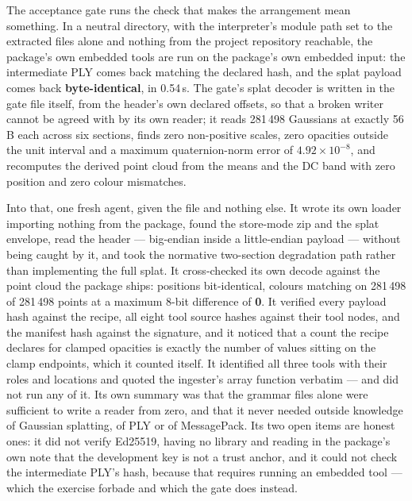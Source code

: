 \documentclass[10pt,twocolumn,letterpaper]{article}
\begin{document}
The acceptance gate runs the check that makes the arrangement mean something. In a neutral directory, with the interpreter's module path set to the extracted files alone and nothing from the project repository reachable, the package's own embedded tools are run on the package's own embedded input: the intermediate PLY comes back matching the declared hash, and the splat payload comes back \textbf{byte-identical}, in 0.54\,s. The gate's splat decoder is written in the gate file itself, from the header's own declared offsets, so that a broken writer cannot be agreed with by its own reader; it reads 281\,498 Gaussians at exactly 56\,B each across six sections, finds zero non-positive scales, zero opacities outside the unit interval and a maximum quaternion-norm error of $4.92\times10^{-8}$, and recomputes the derived point cloud from the means and the DC band with zero position and zero colour mismatches.

Into that, one fresh agent, given the file and nothing else. It wrote its own loader importing nothing from the package, found the store-mode zip and the splat envelope, read the header --- big-endian inside a little-endian payload --- without being caught by it, and took the normative two-section degradation path rather than implementing the full splat. It cross-checked its own decode against the point cloud the package ships: positions bit-identical, colours matching on 281\,498 of 281\,498 points at a maximum 8-bit difference of \textbf{0}. It verified every payload hash against the recipe, all eight tool source hashes against their tool nodes, and the manifest hash against the signature, and it noticed that a count the recipe declares for clamped opacities is exactly the number of values sitting on the clamp endpoints, which it counted itself. It identified all three tools with their roles and locations and quoted the ingester's array function verbatim --- and did not run any of it. Its own summary was that the grammar files alone were sufficient to write a reader from zero, and that it never needed outside knowledge of Gaussian splatting, of PLY or of MessagePack. Its two open items are honest ones: it did not verify Ed25519, having no library and reading in the package's own note that the development key is not a trust anchor, and it could not check the intermediate PLY's hash, because that requires running an embedded tool --- which the exercise forbade and which the gate does instead.
\end{document}
